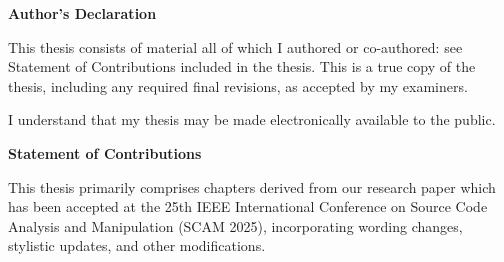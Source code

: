 \cleardoublepage %
 

 \begin{center}\textbf{Author's Declaration}\end{center}

 \noindent
This thesis consists of material all of which I authored or co-authored: see Statement of
Contributions included in the thesis. This is a true copy of the thesis, including any required final revisions, as accepted by my examiners.
 \noindent  
  \bigskip
  
  \noindent
I understand that my thesis may be made electronically available to the public.

\cleardoublepage
{}    %

 \begin{center}\textbf{Statement of Contributions}\end{center}

This thesis primarily comprises chapters derived from our research paper which has been
accepted at the 25th IEEE International Conference on Source Code Analysis and Manipulation (SCAM 2025), incorporating wording changes, stylistic updates, and other
modifications.

